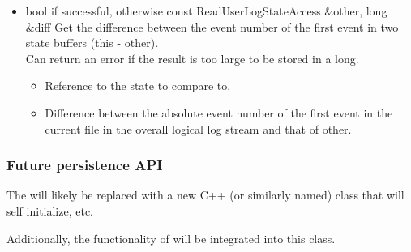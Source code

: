 \begin{itemize}
\begin{itemize}
\item {}
  {bool} { if successful,  otherwise}
  {const ReadUserLogStateAccess \&other, long \&diff}
  {Get the difference between the event number of the first event in
    two state buffers (this - other).
    \\ \Note Can return an error if the result is too large
    to be stored in a long.}
  \begin{itemize}
  \item {}
    Reference to the state to compare to.
  \item {}
    Difference between the absolute event number of the first event in
    the current file in the overall logical log stream and that of
    other.
  \end{itemize}

\end{itemize}	%

\end{itemize}

\subsubsection{Future persistence API}
The  will likely be replaced with a new
C++  (or similarly named) class that
will self initialize, etc.

Additionally, the functionality of  will
be integrated into this class.
